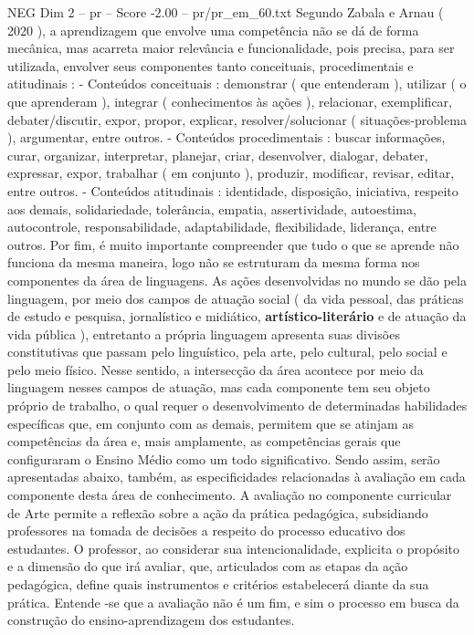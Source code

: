 \begin{textsample}{NEG Dim 2 – pr – Score -2.00 – pr/pr\_em\_60.txt}
Segundo Zabala e Arnau ( 2020 ), a aprendizagem que envolve uma competência não se dá de forma mecânica, mas acarreta maior relevância e funcionalidade, pois precisa, para ser utilizada, envolver seus componentes tanto conceituais, procedimentais e atitudinais : - Conteúdos conceituais : demonstrar ( que entenderam ), utilizar ( o que aprenderam ), integrar ( conhecimentos às ações ), relacionar, exemplificar, debater/discutir, expor, propor, explicar, resolver/solucionar ( situações-problema ), argumentar, entre outros. - Conteúdos procedimentais : buscar informações, curar, organizar, interpretar, planejar, criar, desenvolver, dialogar, debater, expressar, expor, trabalhar ( em conjunto ), produzir, modificar, revisar, editar, entre outros. - Conteúdos atitudinais : identidade, disposição, iniciativa, respeito aos demais, solidariedade, tolerância, empatia, assertividade, autoestima, autocontrole, responsabilidade, adaptabilidade, flexibilidade, liderança, entre outros.
Por fim, é muito importante compreender que tudo o que se aprende não funciona da mesma maneira, logo não se estruturam da mesma forma nos componentes da área de linguagens.
As ações desenvolvidas no mundo se dão pela linguagem, por meio dos campos de atuação social ( da vida pessoal, das práticas de estudo e pesquisa, jornalístico e midiático, \textbf{artístico-literário} e de atuação da vida pública ), entretanto a própria linguagem apresenta suas divisões constitutivas que passam pelo linguístico, pela arte, pelo cultural, pelo social e pelo meio físico.
Nesse sentido, a intersecção da área acontece por meio da linguagem nesses campos de atuação, mas cada componente tem seu objeto próprio de trabalho, o qual requer o desenvolvimento de determinadas habilidades específicas que, em conjunto com as demais, permitem que se atinjam as competências da área e, mais amplamente, as competências gerais que configuraram o Ensino Médio como um todo significativo.
Sendo assim, serão apresentadas abaixo, também, as especificidades relacionadas à avaliação em cada componente desta área de conhecimento.
A avaliação no componente curricular de Arte permite a reflexão sobre a ação da prática pedagógica, subsidiando professores na tomada de decisões a respeito do processo educativo dos estudantes.
O professor, ao considerar sua intencionalidade, explicita o propósito e a dimensão do que irá avaliar, que, articulados com as etapas da ação pedagógica, define quais instrumentos e critérios estabelecerá diante da sua prática.
Entende -se que a avaliação não é um fim, e sim o processo em busca da construção do ensino-aprendizagem dos estudantes.

\end{textsample}
